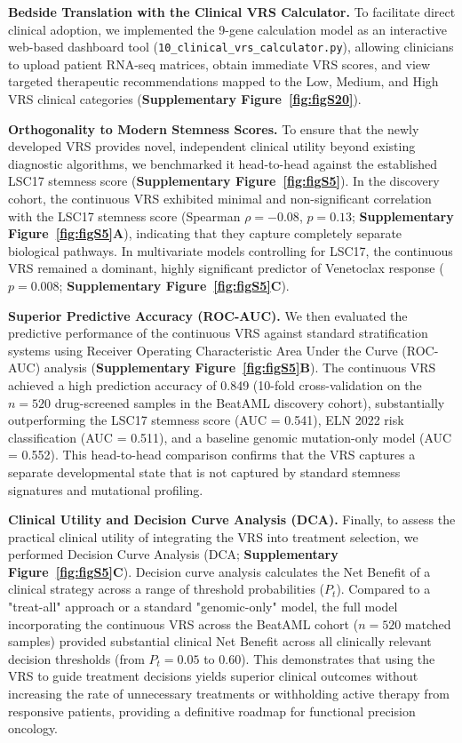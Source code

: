 \documentclass[11pt,a4paper]{article}
\begin{document}
\textbf{Bedside Translation with the Clinical VRS Calculator.} To facilitate direct clinical adoption, we implemented the 9-gene calculation model as an interactive web-based dashboard tool (\texttt{10\_clinical\_vrs\_calculator.py}), allowing clinicians to upload patient RNA-seq matrices, obtain immediate VRS scores, and view targeted therapeutic recommendations mapped to the Low, Medium, and High VRS clinical categories (\textbf{Supplementary Figure~\ref{fig:figS20}}).

\textbf{Orthogonality to Modern Stemness Scores.} To ensure that the newly developed VRS provides novel, independent clinical utility beyond existing diagnostic algorithms, we benchmarked it head-to-head against the established LSC17 stemness score (\textbf{Supplementary Figure~\ref{fig:figS5}}). In the discovery cohort, the continuous VRS exhibited minimal and non-significant correlation with the LSC17 stemness score (Spearman $\rho = -0.08$, $p = 0.13$; \textbf{Supplementary Figure~\ref{fig:figS5}A}), indicating that they capture completely separate biological pathways. In multivariate models controlling for LSC17, the continuous VRS remained a dominant, highly significant predictor of Venetoclax response ($p = 0.008$; \textbf{Supplementary Figure~\ref{fig:figS5}C}).

\textbf{Superior Predictive Accuracy (ROC-AUC).} We then evaluated the predictive performance of the continuous VRS against standard stratification systems using Receiver Operating Characteristic Area Under the Curve (ROC-AUC) analysis (\textbf{Supplementary Figure~\ref{fig:figS5}B}). The continuous VRS achieved a high prediction accuracy of 0.849 (10-fold cross-validation on the $n=520$ drug-screened samples in the BeatAML discovery cohort), substantially outperforming the LSC17 stemness score (AUC = 0.541), ELN 2022 risk classification (AUC = 0.511), and a baseline genomic mutation-only model (AUC = 0.552). This head-to-head comparison confirms that the VRS captures a separate developmental state that is not captured by standard stemness signatures and mutational profiling.

\textbf{Clinical Utility and Decision Curve Analysis (DCA).} Finally, to assess the practical clinical utility of integrating the VRS into treatment selection, we performed Decision Curve Analysis (DCA; \textbf{Supplementary Figure~\ref{fig:figS5}C}). Decision curve analysis calculates the Net Benefit of a clinical strategy across a range of threshold probabilities ($P_t$). Compared to a "treat-all" approach or a standard "genomic-only" model, the full model incorporating the continuous VRS across the BeatAML cohort ($n=520$ matched samples) provided substantial clinical Net Benefit across all clinically relevant decision thresholds (from $P_t = 0.05$ to $0.60$). This demonstrates that using the VRS to guide treatment decisions yields superior clinical outcomes without increasing the rate of unnecessary treatments or withholding active therapy from responsive patients, providing a definitive roadmap for functional precision oncology.
\end{document}
